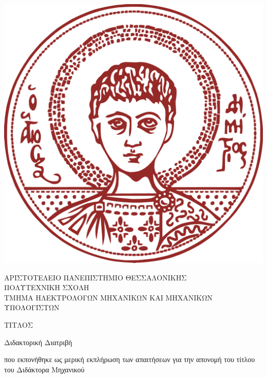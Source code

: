 \begin{center}

  \includegraphics[scale=0.2]{./figures/0.title_page/auth_logo.png}


  {ΑΡΙΣΤΟΤΕΛΕΙΟ ΠΑΝΕΠΙΣΤΗΜΙΟ ΘΕΣΣΑΛΟΝΙΚΗΣ\\
   \vspace{-0.2cm}
   ΠΟΛΥΤΕΧΝΙΚΗ ΣΧΟΛΗ\\
   \vspace{-0.2cm}
   ΤΜΗΜΑ ΗΛΕΚΤΡΟΛΟΓΩΝ ΜΗΧΑΝΙΚΩΝ ΚΑΙ ΜΗΧΑΝΙΚΩΝ ΥΠΟΛΟΓΙΣΤΩΝ} \\

   \vspace{1cm}

   {ΤΙΤΛΟΣ}

   \vspace{1cm}

   {Διδακτορική Διατριβή}

   \vspace{1cm}

   {που εκπονήθηκε ως μερική εκπλήρωση των απαιτήσεων για την απονομή του
   τίτλου του Διδάκτορα Μηχανικού}

   \vspace{0.5cm}


\end{center}
